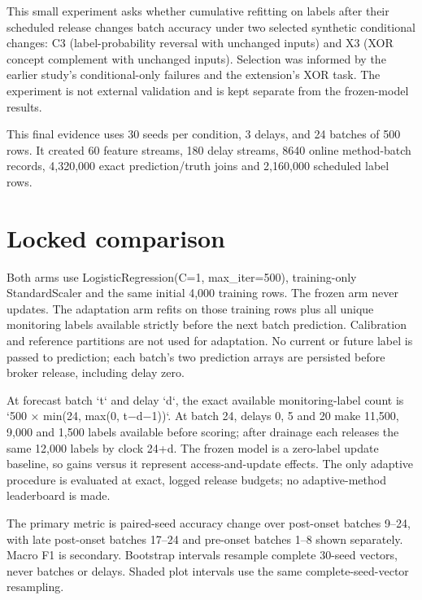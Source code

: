 \documentclass[11pt,a4paper]{article}
\begin{document}
This small experiment asks whether cumulative refitting on labels after their scheduled release changes batch accuracy under two selected synthetic conditional changes: C3 (label-probability reversal with unchanged inputs) and X3 (XOR concept complement with unchanged inputs). Selection was informed by the earlier study's conditional-only failures and the extension's XOR task. The experiment is not external validation and is kept separate from the frozen-model results.\par

This final evidence uses 30 seeds per condition, 3 delays, and 24 batches of 500 rows. It created 60 feature streams, 180 delay streams, 8640 online method-batch records, 4,320,000 exact prediction/truth joins and 2,160,000 scheduled label rows.\par

\section{Locked comparison}

Both arms use LogisticRegression(C=1, max\_iter=500), training-only StandardScaler and the same initial 4,000 training rows. The frozen arm never updates. The adaptation arm refits on those training rows plus all unique monitoring labels available strictly before the next batch prediction. Calibration and reference partitions are not used for adaptation. No current or future label is passed to prediction; each batch's two prediction arrays are persisted before broker release, including delay zero.\par

At forecast batch `t` and delay `d`, the exact available monitoring-label count is `500 × min(24, max(0, t−d−1))`. At batch 24, delays 0, 5 and 20 make 11,500, 9,000 and 1,500 labels available before scoring; after drainage each releases the same 12,000 labels by clock 24+d. The frozen model is a zero-label update baseline, so gains versus it represent access-and-update effects. The only adaptive procedure is evaluated at exact, logged release budgets; no adaptive-method leaderboard is made.\par

The primary metric is paired-seed accuracy change over post-onset batches 9–24, with late post-onset batches 17–24 and pre-onset batches 1–8 shown separately. Macro F1 is secondary. Bootstrap intervals resample complete 30-seed vectors, never batches or delays. Shaded plot intervals use the same complete-seed-vector resampling.\par
\end{document}
